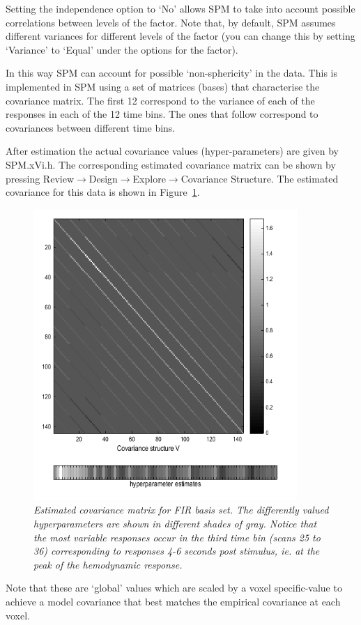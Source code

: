 Setting the independence option to `No' allows SPM to take into account possible correlations between levels of the factor. Note that, by default, SPM assumes different variances 
for different levels of the factor (you can change this by setting `Variance' to `Equal' under the options for the factor). 

In this way SPM can account for possible `non-sphericity' in the data. This is implemented in SPM using a set of matrices (bases) that characterise the covariance matrix. The first 12 correspond to the variance of each of the responses in 
each of the 12 time bins. The ones that follow  correspond to covariances between different time bins.

After estimation the actual covariance values (hyper-parameters) are given by SPM.xVi.h. The corresponding estimated 
covariance matrix can be shown by pressing Review$\rightarrow$Design$\rightarrow$Explore$\rightarrow$Covariance Structure. The estimated covariance for this data is shown in Figure~\ref{fir_covariance}.
\begin{figure}
\begin{center}
\includegraphics[width=100mm]{faces_group/fir_covariance}
\caption{\em Estimated covariance matrix for FIR basis set. The differently valued hyperparameters are shown in different shades of gray. Notice that the most variable responses occur in the third time bin (scans 25 to 36) corresponding to responses 4-6 seconds post stimulus, ie. at the peak of the hemodynamic response. \label{fir_covariance}}
\end{center}
\end{figure}
Note that these are `global' values which are scaled by a voxel specific-value to achieve a model covariance that best matches the empirical covariance at each voxel. 

